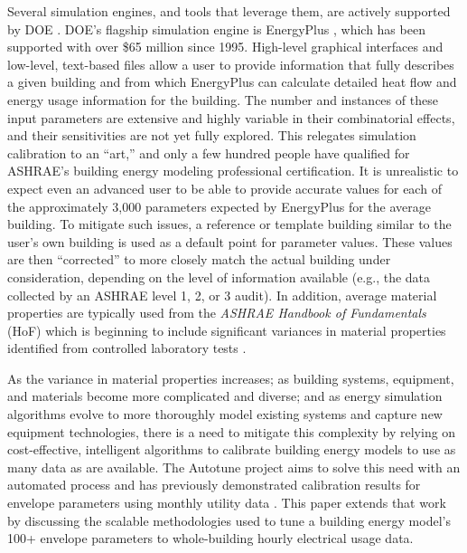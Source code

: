 \documentclass[preprint, review, 12pt]{elsarticle}
\begin{document}
Several simulation engines, and tools that leverage them, are actively supported by DOE \cite{cit:doetools2012}. DOE’s flagship simulation engine is EnergyPlus \cite{cit:energyplus}, which has been supported with over \$65 million since 1995. %
High-level graphical interfaces and low-level, text-based files allow a user to provide information that fully describes a given building and from which EnergyPlus can calculate detailed heat flow and energy usage information for the building. The number and instances of these input parameters are extensive and highly variable in their combinatorial effects, and their sensitivities are not yet fully explored. This relegates simulation calibration to an ``art,'' and only a few hundred people have qualified for ASHRAE's building energy modeling professional certification. It is unrealistic to expect even an advanced user to be able to provide accurate values for each of the approximately 3,000 parameters expected by EnergyPlus for the average building. To mitigate such issues, a reference or template building similar to the user's own building is used as a default point for parameter values. These values are then ``corrected'' to more closely match the actual building under consideration, depending on the level of information available (e.g., the data collected by an ASHRAE level 1, 2, or 3 audit). In addition, average material properties are typically used from the \textit{ASHRAE Handbook of Fundamentals} (HoF) which is beginning to include significant variances in material properties identified from controlled laboratory tests \cite{cit:ashrae2013}.

As the variance in material properties increases; as building systems, equipment, and materials become more complicated and diverse; and as energy simulation algorithms evolve to more thoroughly model existing systems and capture new equipment technologies, there is a need to mitigate this complexity by relying on cost-effective, intelligent algorithms to calibrate building energy models to use as many data as are available. The Autotune project \cite{cit:new2012} aims to solve this need with an automated process and has previously demonstrated calibration results for envelope parameters using monthly utility data \cite{cit:garrett2013}. This paper extends that work by discussing the scalable methodologies used to tune a building energy model's 100+ envelope parameters to whole-building hourly electrical usage data.
\end{document}
